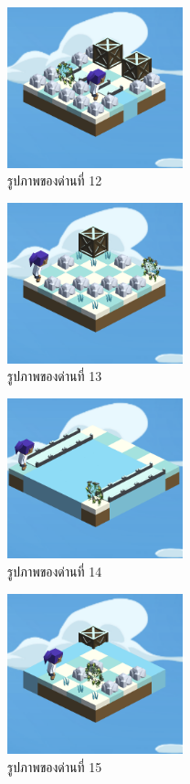 \begin{figure}[H]
    \begin{center}
    \includegraphics[width=2in]{pic-toro/stage/s12.png}
    \end{center}
    \caption[รูปภาพของด่านที่ 12]{รูปภาพของด่านที่ 12}
    \label{s12}
\end{figure}
\begin{figure}[H]
    \begin{center}
    \includegraphics[width=2in]{pic-toro/stage/s13.png}
    \end{center}
    \caption[รูปภาพของด่านที่ 13]{รูปภาพของด่านที่ 13}
    \label{s13}
\end{figure}
\begin{figure}[H]
    \begin{center}
    \includegraphics[width=2in]{pic-toro/stage/s14.png}
    \end{center}
    \caption[รูปภาพของด่านที่ 14]{รูปภาพของด่านที่ 14}
    \label{s14}
\end{figure}
\begin{figure}[H]
    \begin{center}
    \includegraphics[width=2in]{pic-toro/stage/s15.png}
    \end{center}
    \caption[รูปภาพของด่านที่ 15]{รูปภาพของด่านที่ 15}
    \label{s15}
\end{figure}
